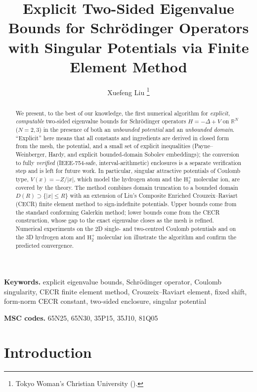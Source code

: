 \documentclass[11pt]{article}
\title{Explicit Two-Sided Eigenvalue Bounds for Schr\"{o}dinger
       Operators with Singular Potentials via Finite Element Method}
\author{%
  Xuefeng Liu%
  \thanks{Tokyo Woman's Christian University (\email{xfliu@lab.twcu.ac.jp}).}%
}
\theoremstyle{plain}
\theoremstyle{definition}
\theoremstyle{remark}
\newenvironment{keywords}{\par\medskip\noindent\textbf{Keywords.}}{\par}
\newenvironment{AMS}{\par\medskip\noindent\textbf{MSC codes.}}{\par}
\begin{document}
\maketitle

\begin{abstract}
We present, to the best of our knowledge, the first numerical
algorithm for \emph{explicit, computable} two-sided eigenvalue
bounds for Schr\"odinger operators $H = -\Delta + V$ on $\mathbb{R}^N$
($N=2,3$) in the presence of both an \emph{unbounded potential}
and an \emph{unbounded domain}. ``Explicit'' here means that all
constants and ingredients are derived in closed form from the mesh,
the potential, and a small set of explicit inequalities
(Payne--Weinberger, Hardy, and explicit bounded-domain Sobolev
embeddings); the conversion to fully \emph{verified}
(IEEE-754-safe, interval-arithmetic) enclosures is a separate
verification step and is left for future work.
In particular, singular attractive potentials of Coulomb type,
$V(x)=-Z/|x|$, which model the hydrogen atom and the $\mathrm{H}_2^+$
molecular ion, are covered by the theory.
The method combines domain truncation to a bounded domain $D(R)\supset\{|x|\le R\}$
with an extension of Liu's Composite Enriched Crouzeix--Raviart
(CECR) finite element method to sign-indefinite potentials. Upper
bounds come from the standard conforming Galerkin method; lower
bounds come from the CECR construction, whose gap to the exact
eigenvalue closes as the mesh is refined.
Numerical experiments on the 2D single- and two-centred Coulomb
potentials and on the 3D hydrogen atom and $\mathrm{H}_2^+$
molecular ion illustrate the algorithm and confirm the predicted
convergence.
\end{abstract}

\begin{keywords}
explicit eigenvalue bounds, Schr\"odinger operator, Coulomb singularity,
CECR finite element method, Crouzeix--Raviart element,
fixed shift, form-norm CECR constant, two-sided enclosure, singular potential
\end{keywords}

\begin{AMS}
65N25, 65N30, 35P15, 35J10, 81Q05
\end{AMS}

\section{Introduction}
\label{sec:intro}
\end{document}
